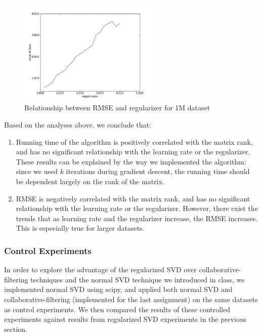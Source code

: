 \documentclass[12pt]{article}
\begin{document}
\begin{figure}[H]
\centering
\includegraphics[width=0.60\textwidth]{graphs/bigrmsereg.png}
\caption{Relationship between RMSE and regularizer for 1M dataset}
\end{figure}

\noindent Based on the analyses above, we conclude that:
\begin{enumerate}
  \item Running time of the algorithm is positively correlated with the matrix rank, and has no significant relationship with the learning rate or the regularizer. These results can be explained by the way we implemented the algorithm: since we used $k$ iterations during gradient descent, the running time should be dependent largely on the rank of the matrix.
  \item RMSE is negatively correlated with the matrix rank, and has no significant relationship with the learning rate or the regularizer. However, there exist the trends that as learning rate and the regularizer increase, the RMSE increases. This is especially true for larger datasets.
\end{enumerate}

\subsubsection*{Control Experiments}

In order to explore the advantage of the regularized SVD over 
collaborative-filtering techniques and the normal SVD technique
we introduced in class, we implemented normal SVD using scipy, and
applied both normal SVD and collaborative-filtering (implemented for the
last assignment) on the same datasets as control experiments. We then
compared the results of these controlled experiments against results from 
regularized SVD experiments in the previous section.\\
\end{document}
